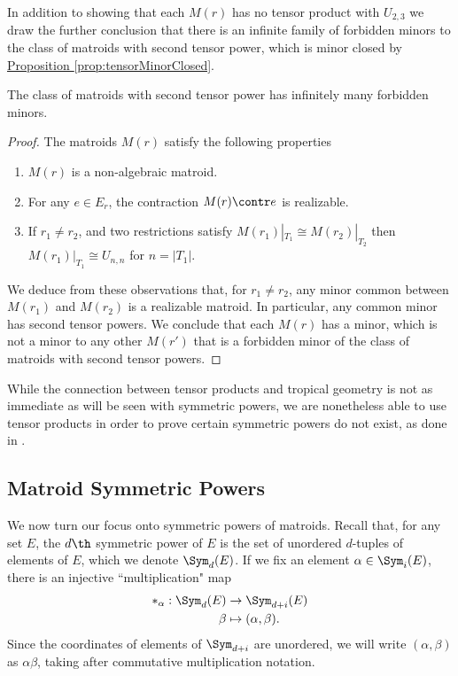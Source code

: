     In addition to showing that each $M(r)$ has no tensor product with $U_{2,3}$ we draw the further conclusion that there is an infinite family of forbidden minors to the class of matroids with second tensor power, which is minor closed by \hyperref[prop:tensorMinorClosed]{Proposition \ref*{prop:tensorMinorClosed}}.
    \begin{corollary}\label{cor:tensorForbiddenMinors}
        The class of matroids with second tensor power has infinitely many forbidden minors.
    \end{corollary}
    \begin{proof}
    The matroids $M(r)$ satisfy the following properties \cite{Lind88}
    \begin{enumerate}
        \item $M(r)$ is a non-algebraic matroid.
        \item For any $e\in E_r$, the contraction $M(r) \contr e$ is realizable.
        \item If $r_1\neq r_2$, and two restrictions satisfy $M(r_1)|_{T_1}\cong M(r_2)|_{T_2}$ then $M(r_1)|_{T_1}\cong U_{n,n}$ for $n= |T_1|$.
    \end{enumerate}
    We deduce from these observations that, for $r_1\neq r_2$, any minor common between $M(r_1)$ and $M(r_2)$ is a realizable matroid. In particular, any common minor has second tensor powers. We conclude that each $M(r)$ has a minor, which is not a minor to any other $M(r')$ that is a forbidden minor of the class of matroids with second tensor powers.
    \end{proof}

    While the connection between tensor products and tropical geometry is not as immediate as will be seen with symmetric powers, we are nonetheless able to use tensor products in order to prove certain symmetric powers do not exist, as done in \cite{DR19}.

\subsection{Matroid Symmetric Powers}
We now turn our focus onto symmetric powers of matroids. Recall that, for any set $E$, the $d\th$ symmetric power of $E$ is the set of unordered $d$-tuples of elements of $E$, which we denote $\Sym_d(E)$. If we fix an element $\alpha \in \Sym_i(E)$, there is an injective ``multiplication" map
    \begin{align*}
        *_\alpha: \Sym_d(E)&\to \Sym_{d+i}(E)\\
        \beta&\mapsto (\alpha,\beta).
    \end{align*}
Since the coordinates of elements of $\Sym_{d+i}$ are unordered, we will write $(\alpha,\beta)$ as $\alpha\beta$, taking after commutative multiplication notation. 

